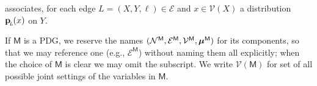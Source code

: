 \documentclass{article}
\newcommand{\bp}[1][L]{\mat{p}_{\!_#1\!}}
\newcommand{\V}{\mathcal V}
\newcommand{\Ed}{\mathcal E}
\newcommand{\sfM}{\mathsf M}
\newcommand{\MN}{PDG}
\numberwithin{equation}{section}
\begin{document}
\begin{defn}[\MN]
\begin{description}[nosep]
			  associates, for each edge $L = (X,Y, \ell) \in
                          \Ed$ and $x \in \V(X)$ a distribution $\bp(x)$ on $Y$. 

		\end{description}%

	\end{defn}
	If $\sfM$ is a \MN, we reserve the names $\mnvars[^\sfM]$ for its components, so that we may reference one (e.g., $\Ed^\sfM$) without naming them all explicitly; when the choice of $\sfM$ is clear we may omit the subscript.
	We write $\V(\sfM)$ for set of all possible joint settings of the variables in $\sfM$. 
\end{document}
